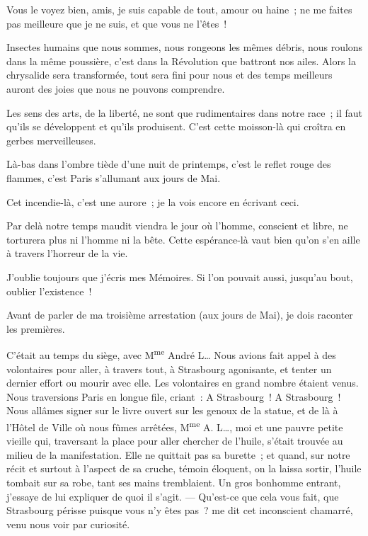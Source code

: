 \documentclass[french,twoside]{book} %
\begin{document}
\noindent Vous le voyez bien, amis, je suis capable de tout, amour ou haine ; ne me faites pas meilleure que je ne suis, et que vous ne l’êtes !\par
Insectes humains que nous sommes, nous rongeons les mêmes débris, nous roulons dans la même poussière, c’est dans la Révolution que battront nos ailes. Alors la chrysalide sera transformée, tout sera fini pour nous et des temps meilleurs auront des joies que nous ne pouvons comprendre.\par
Les sens des arts, de la liberté, ne sont que rudimentaires dans notre race ; il faut qu’ils se  développent et qu’ils produisent. C’est cette moisson-là qui croîtra en gerbes merveilleuses.\par
\bigbreak
\noindent Là-bas dans l’ombre tiède d’une nuit de printemps, c’est le reflet rouge des flammes, c’est Paris s’allumant aux jours de Mai.\par
Cet incendie-là, c’est une aurore ; je la vois encore en écrivant ceci.\par
Par delà notre temps maudit viendra le jour où l’homme, conscient et libre, ne torturera plus ni l’homme ni la bête. Cette espérance-là vaut bien qu’on s’en aille à travers l’horreur de la vie.\par
J’oublie toujours que j’écris mes Mémoires. Si l’on pouvait aussi, jusqu’au bout, oublier l’existence !\par
Avant de parler de ma troisième arrestation (aux jours de Mai), je dois raconter les premières.\par
\bigbreak
\noindent C’était au temps du siège, avec M\textsuperscript{me} André L… Nous avions fait appel à des volontaires pour aller, à travers tout, à Strasbourg agonisante, et tenter un dernier effort ou mourir avec elle. Les volontaires en grand nombre étaient venus. Nous traversions Paris en longue file, criant : A Strasbourg ! A Strasbourg ! Nous allâmes signer sur le livre ouvert sur les genoux de la statue, et de là à l’Hôtel de Ville où nous fûmes arrêtées,  M\textsuperscript{me} A. L…, moi et une pauvre petite vieille qui, traversant la place pour aller chercher de l’huile, s’était trouvée au milieu de la manifestation. Elle ne quittait pas sa burette ; et quand, sur notre récit et surtout à l’aspect de sa cruche, témoin éloquent, on la laissa sortir, l’huile tombait sur sa robe, tant ses mains tremblaient. Un gros bonhomme entrant, j’essaye de lui expliquer de quoi il s’agit. — Qu’est-ce que cela vous fait, que Strasbourg périsse puisque vous n’y êtes pas ? me dit cet inconscient chamarré, venu nous voir par curiosité.\par
\end{document}
